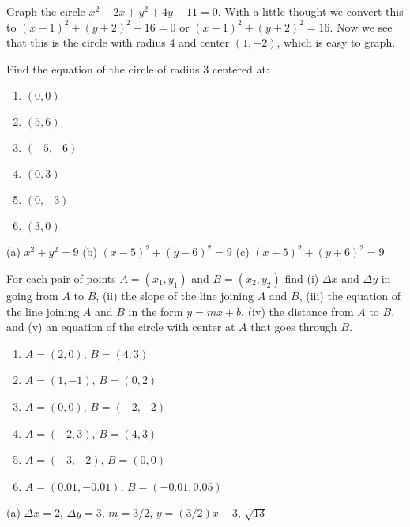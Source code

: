 \begin{example} Graph the circle $x^2-2x+y^2+4y-11=0$. With a little thought
we convert this to $(x-1)^2+(y+2)^2-16=0$ or $(x-1)^2+(y+2)^2=16$.
Now we see that this is the circle with radius 4 and center $(1,-2)$,
which is easy to graph.
\end{example}

\begin{exercises}

\begin{exercise}
Find the equation of the circle of radius 3 centered at: 
\begin{multicols}{2}
\begin{enumerate} 
\item $(0,0)$
\item $(5,6)$  
\item $(-5,-6)$
\columnbreak  
\item $(0,3)$
\item $(0,-3)$
\item $(3,0)$
\end{enumerate}
\end{multicols}
\begin{answer} (a) $x^2+y^2=9$
{} (b) $(x-5)^2+(y-6)^2=9$
{} (c) $(x+5)^2+(y+6)^2=9$
\end{answer}\end{exercise}

\begin{exercise}
For each pair of points $A=(x_1,y_1)$ and $B=(x_2,y_2)$ find (i) $\Delta x$
and $\Delta y$ in going from $A$ to $B$, (ii) the slope of the line joining
$A$ and $B$, (iii) the equation of the line joining $A$ and $B$ in the form
$y=mx+b$, (iv) the distance from $A$ to $B$, and (v) an equation of
the circle with center at $A$ that goes through $B$.

\begin{multicols}{2}
\begin{enumerate} 
\item $A = (2,0)$, $B = (4,3)$ 
\item $A=(1,-1)$, $B=(0,2)$
\item $A=(0,0)$, $B=(-2,-2)$ 
\columnbreak
\item $A=(-2,3)$, $B=(4,3)$
\item $A=(-3,-2)$, $B=(0,0)$ 
\item $A=(0.01,-0.01)$, $B=(-0.01,0.05)$
\end{enumerate}
\end{multicols}
\begin{answer} (a) $\Delta x=2$, $\Delta y = 3$, $m=3/2$, $y=(3/2)x-3$, $\sqrt{13}$


\end{answer}
\end{exercise}
\end{exercises}
